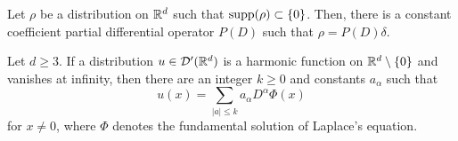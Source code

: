 \documentclass[12pt]{article}
\begin{document}
\begin{lem*}
Let $\rho$ be a distribution on $\mathbb{R}^d$ such that $\operatorname{supp}(\rho)\subset\{0\}$.
Then, there is a constant coefficient partial differential operator $P(D)$ such that $\rho=P(D)\delta$.
\end{lem*}
\begin{cor*}
Let $d\ge3$.
If a distribution $u\in\mathcal{D}'(\mathbb{R}^d)$ is a harmonic function on $\mathbb{R}^d\setminus\{0\}$ and vanishes at infinity, then there are an integer $k\ge0$ and constants $a_\alpha$ such that
\[u(x)=\sum_{|a|\le k}a_\alpha D^\alpha\Phi(x)\]
for $x\ne0$, where $\Phi$ denotes the fundamental solution of Laplace's equation.
\end{cor*}
\end{document}
